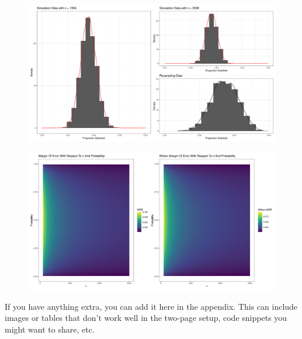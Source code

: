 \documentclass{article}\usepackage[]{graphicx}\usepackage[]{xcolor}
\begin{document}
  \begin{figure}[H]
    \begin{center}
       \includegraphics[scale=0.35]{graphs.pdf}
       \caption{}
     \label{moe}
     \end{center}
   \end{figure}
   \begin{figure}[H]
    \begin{center}
       \includegraphics[scale=0.35]{raster.pdf}
       \caption{}
     \label{moe}
     \end{center}
   \end{figure}
If you have anything extra, you can add it here in the appendix. This can include images or tables that don't work well in the two-page setup, code snippets you might want to share, etc.
\end{document}
